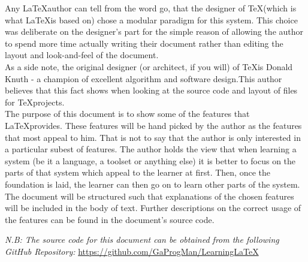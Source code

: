 Any \LaTeX author can tell from the word go, that the designer of \TeX (which is what \LaTeX is based on) chose a modular paradigm for this system. This choice was deliberate on the designer's part for the simple reason of allowing the author to spend more time actually writing their document rather than editing the layout and look-and-feel of the document.\\
\indent{}As a side note, the original designer (or architect, if you will) of \TeX is Donald Knuth - a champion of excellent algorithm and software design.This author believes that this fact shows when looking at the source code and layout of files for \TeX projects.\\
\indent{}The purpose of this document is to show some of the features that \LaTeX provides. These features will be hand picked by the author as the features that most appeal to him. That is not to say that the author is only interested in a particular subest of features. The author holds the view that when learning a system (be it a language, a toolset or anything else) it is better to focus on the parts of that system which appeal to the learner at first. Then, once the foundation is laid, the learner can then go on to learn other parts of the system.\\
\indent{}The document will be structured such that explanations of the chosen features will be included in the body of text. Further descriptions on the correct usage of the features can be found in the document's source code.
\begin{center}\emph{N.B: The source code for this document can be obtained from the following GitHub Repository:} \url{https://github.com/GaProgMan/LearningLaTeX}\end{center}



